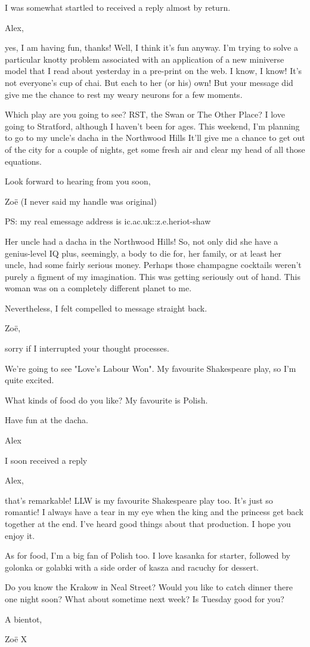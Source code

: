 I was somewhat startled to received a reply almost by return.

{\twelvett Alex,

yes, I am having fun, thanks! Well, I think it's fun anyway. I'm
trying to solve a particular knotty problem associated with an
application of a new miniverse model that I read about yesterday in
a pre-print on the web. I know, I know! It's not everyone's cup of
chai. But each to her (or his) own! But your message did give me the
chance to rest my weary neurons for a few moments.

Which play are you going to see? RST, the Swan or The Other Place? I
love going to Stratford, although I haven't been for ages. This
weekend, I'm planning to go to my uncle's dacha in the Northwood Hills
It'll give me a chance to get out of the city for a couple of
nights, get some fresh air and clear my head of all those equations.

Look forward to hearing from you soon,

Zoë (I never said my handle was original)

PS: my real emessage address is ic.ac.uk::z.e.heriot-shaw}

Her uncle had a dacha in the Northwood Hills! So, not only did she have
a genius-level IQ plus, seemingly, a body to die for, her family, or at least
her uncle, had some fairly serious money. Perhaps those champagne
cocktails weren't purely a figment of my imagination. This was
getting seriously out of hand. This woman was on a completely
different planet to me.

Nevertheless, I felt compelled to message straight back.

{\twelvett Zoë,

sorry if I interrupted your thought processes.

We're going to see "Love's Labour Won". My favourite Shakespeare
play, so I'm quite excited.

What kinds of food do you like? My favourite is Polish.

Have fun at the dacha.

Alex}

I soon received a reply

{\twelvett Alex,

that's remarkable! LLW is my favourite Shakespeare play too. It's
just so romantic! I always have a tear in my eye when the king and
the princess get back together at the end. I've heard good things
about that production. I hope you enjoy it.

As for food, I'm a big fan of Polish too. I love kasanka for
starter, followed by golonka or golabki with a side order of kasza
and racuchy for dessert.

Do you know the Krakow in Neal Street? Would you like to catch
dinner there one night soon? What about sometime next week? Is
Tuesday good for you?

A bientot,

Zoë X}

